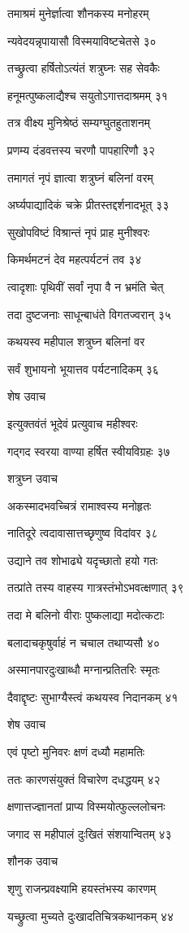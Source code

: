 तमाश्रमं मुनेर्ज्ञात्वा शौनकस्य मनोहरम्

न्यवेदयन्नृपायासौ विस्मयाविष्टचेतसे ३०

तच्छ्रुत्वा हर्षितोऽत्यंतं शत्रुघ्नः सह सेवकैः

हनूमत्पुष्कलाद्यैश्च सयुतोऽगात्तदाश्रमम् ३१

तत्र वीक्ष्य मुनिश्रेष्ठं सम्यग्घुतहुताशनम्

प्रणम्य दंडवत्तस्य चरणौ पापहारिणौ ३२

तमागतं नृपं ज्ञात्वा शत्रुघ्नं बलिनां वरम्

अर्घ्यपाद्यादिकं चक्रे प्रीतस्तद्दर्शनादभूत् ३३

सुखोपविष्टं विश्रान्तं नृपं प्राह मुनीश्वरः

किमर्थमटनं देव महत्पर्यटनं तव ३४

त्वादृशाः पृथिवीं सर्वां नृपा वै न भ्रमंति चेत्

तदा दुष्टजनाः साधून्बाधंते विगतज्वरान् ३५

कथयस्व महीपाल शत्रुघ्न बलिनां वर

सर्वं शुभायनो भूयात्तव पर्यटनादिकम् ३६

शेष उवाच

इत्युक्तवंतं भूदेवं प्रत्युवाच महीश्वरः

गद्गद स्वरया वाण्या हर्षित स्वीयविग्रहः ३७

शत्रुघ्न उवाच

अकस्मादभवच्चित्रं रामाश्वस्य मनोहृतः

नातिदूरे त्वदावासात्तच्छृणुष्व विदांवर ३८

उद्याने तव शोभाढ्ये यदृच्छातो हयो गतः

तत्प्रांते तस्य वाहस्य गात्रस्तंभोऽभवत्क्षणात् ३९

तदा मे बलिनो वीराः पुष्कलाद्या मदोत्कटाः

बलादाचकृषुर्वाहं न चचाल तथाप्यसौ ४०

अस्मानपारदुःखाब्धौ मग्नान्प्रतितरिः स्मृतः

दैवाद्दृष्टः सुभाग्यैस्त्वं कथयस्व निदानकम् ४१

शेष उवाच

एवं पृष्टो मुनिवरः क्षणं दध्यौ महामतिः

ततः कारणसंयुक्तं विचारेण दधद्धयम् ४२

क्षणात्तज्ज्ञानतां प्राप्य विस्मयोत्फुल्ललोचनः

जगाद स महीपालं दुःखितं संशयान्वितम् ४३

शौनक उवाच

शृणु राजन्प्रवक्ष्यामि हयस्तंभस्य कारणम्

यच्छ्रुत्वा मुच्यते दुःखादतिचित्रकथानकम् ४४

